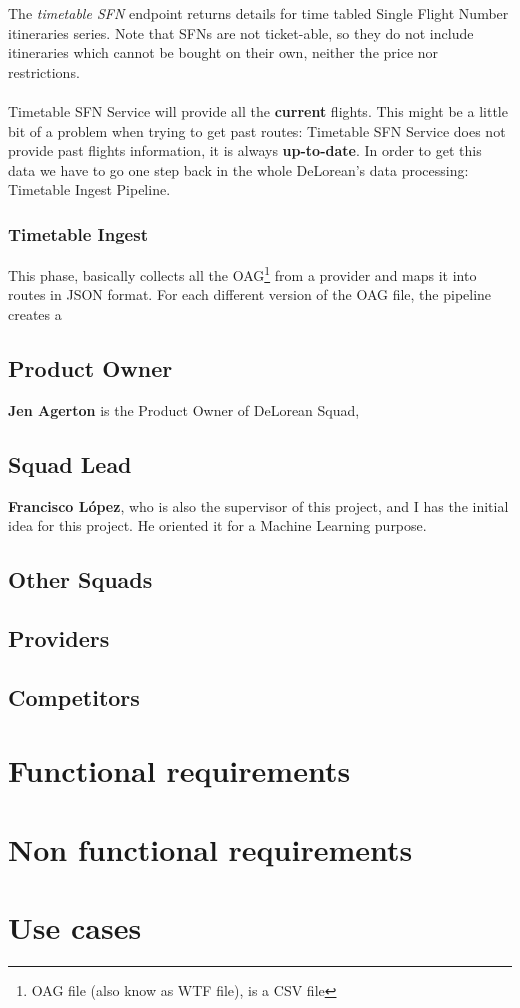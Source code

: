 The \textit{timetable SFN} endpoint returns details for time tabled Single Flight Number itineraries series. Note that SFNs are not ticket-able, so they do not include itineraries which cannot be bought on their own, neither the price nor restrictions.
\\\\
Timetable SFN Service will provide all the \textbf{current} flights. This might be a little bit of a problem when trying to get past routes: Timetable SFN Service does not provide past flights information, it is always \textbf{up-to-date}. In order to get this data we have to go one step back in the whole DeLorean's data processing: Timetable Ingest Pipeline.

\subsubsection{Timetable Ingest}

This phase, basically collects all the OAG\footnote{OAG file (also know as WTF file), is a CSV\cite{csv} file} from a provider and maps it into routes in JSON\cite{json} format. For each different version of the OAG file, the pipeline creates a 

\subsection{Product Owner}

\textbf{Jen Agerton} is the Product Owner of DeLorean Squad, 

\subsection{Squad Lead}

\textbf{Francisco López}, who is also the supervisor of this project, and I has the initial idea for this project. He oriented it for a Machine Learning purpose.

\subsection{Other Squads}

\subsection{Providers}

\subsection{Competitors}

\section{Functional requirements}

\section{Non functional requirements}

\section{Use cases}

